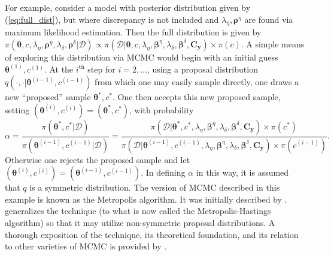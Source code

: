 \documentclass{article}
\begin{document}
For example, consider a model with posterior distribution given by (\ref{eq:full_dist}), but where discrepancy is not included and $\lambda_\eta,\boldsymbol \rho^\eta$ are found via maximum likelihood estimation. Then the full distribution is given by $\pi(\boldsymbol \theta,c,\lambda_\eta,\boldsymbol \rho^\eta,\lambda_\delta,\boldsymbol \rho^\delta|\mathcal D)
\propto \pi(\mathcal D | \boldsymbol \theta,c,\lambda_\eta, \boldsymbol \beta^\eta,\lambda_\delta,\boldsymbol \beta^\delta,\mathbf C_{\mathbf y}) \times \pi(c)$. A simple means of exploring this distribution via MCMC would begin with an initial guess $\boldsymbol \theta^{(1)},c^{(1)}$. At the $i^{\text{th} }$ step for $i=2,\ldots$, using a proposal distribution $q(\cdot,\cdot|{\boldsymbol\theta^{(i-1)},c^{(i-1)}})$ from which one may easily sample directly, one draws a new ``proposed'' sample $\boldsymbol \theta^*,c^*$. One then accepts this new proposed sample, setting $(\boldsymbol\theta^{(i)},c^{(i)}) = (\boldsymbol \theta^*,c^*)$, with probability
\begin{equation}\label{eq:mh-acceptance}
\alpha = \frac{\pi(\boldsymbol \theta^*,c^* | \mathcal D)}{ \pi(\boldsymbol \theta^{(i-1)},c^{(i-1)}|\mathcal D) } = 
\frac{ \pi(\mathcal D | \boldsymbol \theta^*,c^*,\lambda_\eta, \boldsymbol \beta^\eta,\lambda_\delta,\boldsymbol \beta^\delta,\mathbf C_{\mathbf y}) \times \pi(c^*)}{\pi(\mathcal D | \boldsymbol \theta^{(i-1)},c^{(i-1)},\lambda_\eta, \boldsymbol \beta^\eta,\lambda_\delta,\boldsymbol \beta^\delta,\mathbf C_{\mathbf y}) \times \pi(c^{(i-1)})}.
\end{equation}
Otherwise one rejects the proposed sample and let $(\boldsymbol \theta^{(i)},c^{(i)}) = (\boldsymbol \theta^{(i-1)},c^{(i-1)})$. 
In defining $\alpha$ in this way, it is assumed that $q$ is a symmetric distribution. The version of MCMC described in this example is known as the Metropolis algorithm. It was initially described by \cite{Metropolis1953}. \cite{Hastings1970} generalizes the technique (to what is now called the Metropolis-Hastings algorithm) so that it may utilize non-symmetric proposal distributions. A thorough exposition of the technique, its theoretical foundation, and its relation to other  varieties of MCMC is provided by \cite{Chib1995}.
\end{document}
